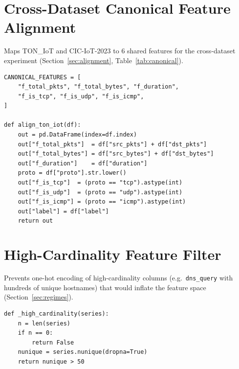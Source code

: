 \documentclass[12pt,a4paper]{report}
\begin{document}
\section*{Cross-Dataset Canonical Feature Alignment}
\label{app:code-align}

Maps TON\_IoT and CIC-IoT-2023 to 6 shared features for the cross-dataset experiment (Section~\ref{sec:alignment}, Table~\ref{tab:canonical}).

\begin{verbatim}
CANONICAL_FEATURES = [
    "f_total_pkts", "f_total_bytes", "f_duration",
    "f_is_tcp", "f_is_udp", "f_is_icmp",
]

def align_ton_iot(df):
    out = pd.DataFrame(index=df.index)
    out["f_total_pkts"]  = df["src_pkts"] + df["dst_pkts"]
    out["f_total_bytes"] = df["src_bytes"] + df["dst_bytes"]
    out["f_duration"]    = df["duration"]
    proto = df["proto"].str.lower()
    out["f_is_tcp"]  = (proto == "tcp").astype(int)
    out["f_is_udp"]  = (proto == "udp").astype(int)
    out["f_is_icmp"] = (proto == "icmp").astype(int)
    out["label"] = df["label"]
    return out
\end{verbatim}

\section*{High-Cardinality Feature Filter}
\label{app:code-highcard}

Prevents one-hot encoding of high-cardinality columns (e.g.\ \texttt{dns\_query} with hundreds of unique hostnames) that would inflate the feature space (Section~\ref{sec:regimes}).

\begin{verbatim}
def _high_cardinality(series):
    n = len(series)
    if n == 0:
        return False
    nunique = series.nunique(dropna=True)
    return nunique > 50
\end{verbatim}
\end{document}
